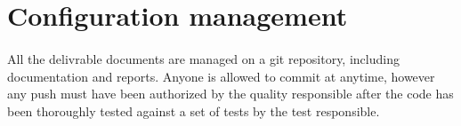 \documentclass{report}
\begin{document}
\section{Configuration management}

\paragraph{}
\hspace{4mm}\textnormal{All the delivrable documents are managed on a git repository, including documentation and reports.
Anyone is allowed to commit at anytime, however any push must have been authorized by the quality responsible after the code
has been thoroughly tested against a set of tests by the test responsible.}
\end{document}
